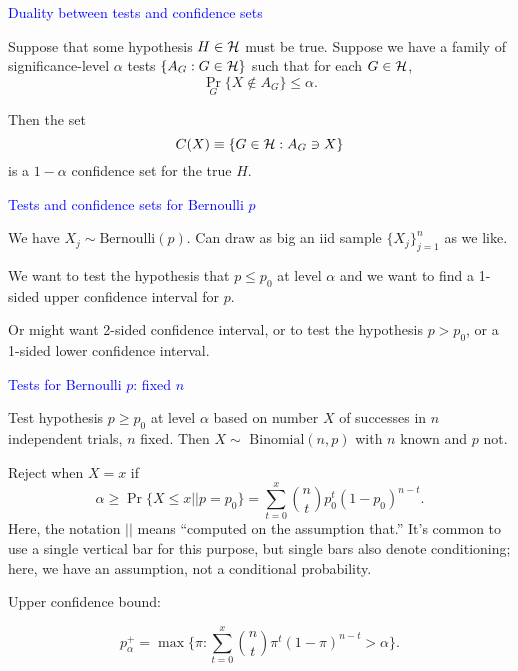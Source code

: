 \documentclass[landscape]{slides}
\newcommand{\cH}{{\cal H}}
\newcommand{\beq}{\begin{equation}}
\newcommand{\eeq}{\end{equation}}
\newcommand{\Binomial}{{\mbox{ Binomial}}}
\begin{document}
\begin{slide}
{\textcolor{blue}{Duality between tests and confidence sets}}

Suppose that some hypothesis $H \in \cH$ must be true.
Suppose we have a family of significance-level $\alpha$ tests
$\{A_G : G \in \cH\}$ such that for each $G \in \cH$,
\beq
     \Pr_G \{ X \notin A_G \} \le \alpha.
\eeq

Then the set
\beq
     C(X) \equiv \{ G \in \cH : A_G \ni X \}
\eeq
is a $1-\alpha$ confidence set for the true $H$.

\end{slide}

\begin{slide}
{\textcolor{blue}{Tests and confidence sets for Bernoulli $p$}}

We have $X_j \sim {\mbox{Bernoulli}}(p)$.
Can draw as big an iid sample $\{ X_j \}_{j=1}^n$ as we like.

We want to test the hypothesis that $p \le p_0$ at level $\alpha$
and we want to find a 1-sided upper confidence interval for $p$.

Or might want 2-sided confidence interval, or to test the hypothesis $p > p_0$,
or a 1-sided lower confidence interval.

\end{slide}


\begin{slide}
{\textcolor{blue}{Tests for Bernoulli $p$: fixed $n$}}

Test hypothesis $p \ge p_0$ at level $\alpha$
based on number $X$ of successes in $n$ independent
trials, $n$ fixed.
Then $X \sim  \Binomial(n, p)$ with $n$ known and $p$ not.

Reject when $X = x$ if 
\beq
   \alpha \ge \Pr \{ X \le x || p = p_0 \} =  \sum_{t=0}^x {{n}\choose{t}} p_0^t (1-p_0)^{n-t}.
\eeq
Here, the notation $||$ means ``computed on the assumption that.''
It's common to use a single vertical bar for this purpose, but single bars also denote
conditioning; here, we have an assumption, not a conditional probability.


Upper confidence bound:

\beq
   p_\alpha^+ = \max \{ \pi: \sum_{t=0}^x {{n}\choose{t}} \pi^t (1-\pi)^{n-t} > \alpha \}.
\eeq
\end{slide}
\end{document}
